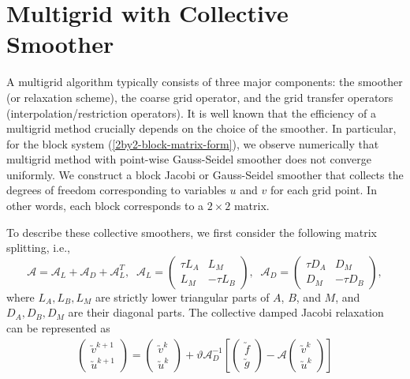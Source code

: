 \documentclass[smallcondensed]{svjour3}
\numberwithin{equation}{section} \numberwithin{table}{section}
\numberwithin{figure}{section}
\numberwithin{algorithm}{section}
\begin{document}
\section{Multigrid with Collective Smoother}
\label{sec:MGsolver}
A multigrid algorithm typically consists of three major components: the smoother (or relaxation scheme), the coarse grid operator, and the grid transfer operators (interpolation/restriction operators). It is well known that the efficiency of a multigrid method crucially depends on the choice of the smoother. In particular, for the block system (\ref{2by2-block-matrix-form}), we observe numerically that multigrid method with point-wise Gauss-Seidel smoother does not converge uniformly. We construct a block Jacobi or Gauss-Seidel smoother that collects the degrees of freedom corresponding to variables $u$ and $v$ for each grid point. In other words, each block corresponds to a $2\times 2$ matrix.

To describe these collective smoothers, we first consider the following matrix splitting, i.e., 
$$
\mathcal{A}=\mathcal{A}_L +\mathcal{A}_D + \mathcal{A}_L^T,\;\;
\mathcal{A}_L =
\left(
\begin{array}{cc}
\tau L_A & L_M\\
L_M &-\tau L_B
\end{array}
\right),
\;\;
\mathcal{A}_D =
\left(
\begin{array}{cc}
\tau D_A & D_M\\
D_M &-\tau D_B
\end{array}
\right),
$$
where $L_A , L_B, L_M$ are strictly lower triangular parts of $A$, $B$, and $M$, and $D_A , D_B, D_M$ are their diagonal parts. The collective damped Jacobi relaxation can be represented as
\begin{align}\label{collective-Jacobi-smoother}
\begin{pmatrix}
\utilde{v}^{k+1}\\
\utilde{u}^{k+1}
\end{pmatrix}
=\begin{pmatrix}
 \utilde{v}^{k}\\
\utilde{u}^{k}
\end{pmatrix}
+
\vartheta\mathcal{A}_D^{-1}
\left[\begin{pmatrix}
 \utilde{f}\\
 \utilde{g}
\end{pmatrix}
-\mathcal{A}
\begin{pmatrix}
 \utilde{v}^{k}\\
\utilde{u}^{k}
\end{pmatrix}\right]
\end{align}
\end{document}
